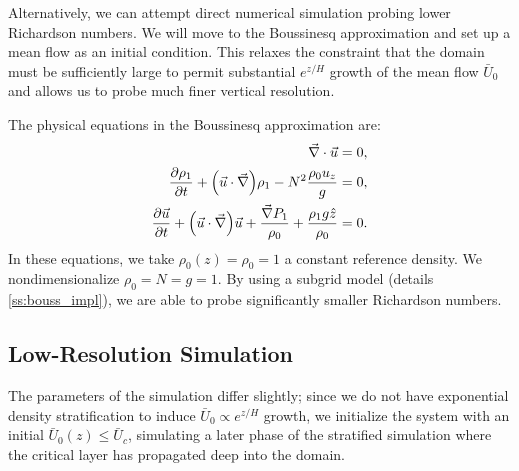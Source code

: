 \documentclass[twocolumn,
        usenames, %
        dvipsnames %
    ]{revtex4-1}%
\newcommand*{\pd}[2]{\frac{\partial#1}{\partial#2}}
\DeclarePairedDelimiter\p{\lparen}{\rparen}
\begin{document}
Alternatively, we can attempt direct numerical simulation probing lower
Richardson numbers. We will move to the Boussinesq approximation and set up a
mean flow as an initial condition. This relaxes the constraint that the domain
must be sufficiently large to permit substantial $e^{z/H}$ growth of the mean
flow $\bar{U}_0$ and allows us to probe much finer vertical resolution.

The physical equations in the Boussinesq approximation are:
\begin{subequations}\label{se:bouss}
    \begin{align}
        \vec{\nabla} \cdot \vec{u} &= 0,\\
        \pd{\rho_1}{t} + \p*{\vec{u} \cdot \vec{\nabla}}\rho_1
            - N^2\frac{\rho_0 u_z}{g} &= 0,\\
        \pd{\vec{u}}{t} + \p*{\vec{u} \cdot \vec{\nabla}}\vec{u}
            + \frac{\vec{\nabla}P_1}{\rho_0}
            + \frac{\rho_1 g\hat{z}}{\rho_0} &= 0.
    \end{align}
\end{subequations}
In these equations, we take $\rho_0(z) = \rho_0 = 1$ a constant reference
density. We nondimensionalize $\rho_0 = N = g = 1$. By using a subgrid model
(details \autoref{ss:bouss_impl}), we are able to probe significantly smaller
Richardson numbers.

\subsection{Low-Resolution Simulation}

The parameters of the simulation differ slightly; since we do not have
exponential density stratification to induce $\bar{U}_0 \propto e^{z/H}$ growth,
we initialize the system with an initial $\bar{U}_0(z) \leq \bar{U}_c$,
simulating a later phase of the stratified simulation where the critical layer
has propagated deep into the domain.
\end{document}

